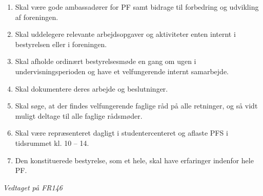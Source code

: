\begin{enumerate}
\item Skal være gode ambassadører for PF samt bidrage til forbedring og udvikling af foreningen.
\item Skal uddelegere relevante arbejdsopgaver og aktiviteter enten internt i bestyrelsen eller i foreningen.
\item Skal afholde ordinært bestyrelsesmøde en gang om ugen i undervisningsperioden og have et velfungerende internt samarbejde.
\item Skal dokumentere deres arbejde og beslutninger.
\item Skal søge, at der findes velfungerende faglige råd på alle retninger, og så vidt muligt deltage til alle faglige rådsmøder.
\item Skal være repræsenteret dagligt i studentercenteret og aflaste PFS i tidsrummet kl. 10 – 14.
\item Den konstituerede bestyrelse, som et hele, skal have erfaringer indenfor hele PF.
\end{enumerate}

\textit{Vedtaget på FR146}
